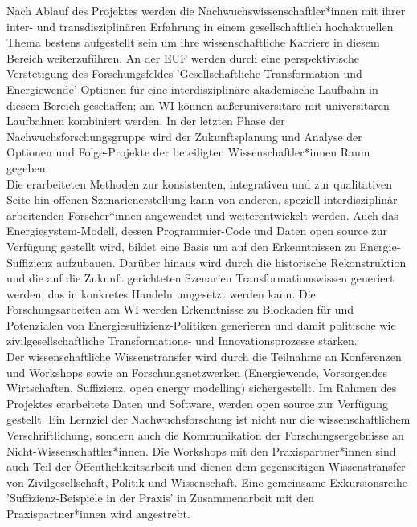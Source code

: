 \documentclass[a4paper,11pt,twoside]{scrartcl}
\begin{document}
Nach Ablauf des Projektes werden die Nachwuchswissenschaftler*innen mit ihrer inter- und transdisziplinären Erfahrung in einem gesellschaftlich hochaktuellen Thema bestens aufgestellt sein um ihre wissenschaftliche Karriere in diesem Bereich weiterzuführen. An der EUF werden durch eine perspektivische Verstetigung des Forschungsfeldes 'Gesellschaftliche Transformation und Energiewende' Optionen für eine interdisziplinäre akademische Laufbahn in diesem Bereich geschaffen; am WI können außeruniversitäre mit universitären Laufbahnen kombiniert werden. In der letzten Phase der Nachwuchsforschungsgruppe wird der Zukunftsplanung und Analyse der Optionen und Folge-Projekte der beteiligten Wissenschaftler*innen Raum gegeben.\\
Die erarbeiteten Methoden zur konsistenten, integrativen und zur qualitativen Seite hin offenen Szenarienerstellung kann von anderen, speziell interdisziplinär arbeitenden Forscher*innen angewendet und weiterentwickelt werden. Auch das Energiesystem-Modell, dessen Programmier-Code und Daten open source zur Verfügung gestellt wird, bildet eine Basis um auf den Erkenntnissen zu Energie-Suffizienz aufzubauen. Darüber hinaus wird durch die historische Rekonstruktion und die auf die Zukunft gerichteten Szenarien Transformationswissen generiert werden, das in konkretes Handeln umgesetzt werden kann. Die Forschungsarbeiten am WI werden Erkenntnisse zu Blockaden für und Potenzialen von Energiesuffizienz-Politiken generieren und damit politische wie zivilgesellschaftliche Transformations- und Innovationsprozesse stärken.\\
Der wissenschaftliche Wissenstransfer wird durch die Teilnahme an Konferenzen und Workshops sowie an Forschungsnetzwerken (Energiewende, Vorsorgendes Wirtschaften, Suffizienz, open energy modelling) sichergestellt. Im Rahmen des Projektes erarbeitete Daten und Software, werden open source zur Verfügung gestellt. Ein Lernziel der Nachwuchsforschung ist nicht nur die wissenschaftlichem Verschriftlichung, sondern auch die Kommunikation der Forschungsergebnisse an Nicht-Wissenschaftler*innen. Die Workshops mit den Praxispartner*innen sind auch Teil der Öffentlichkeitsarbeit und dienen dem gegenseitigen Wissenstransfer von Zivilgesellschaft, Politik und Wissenschaft. Eine gemeinsame Exkursionsreihe 'Suffizienz-Beispiele in der Praxis' in Zusammenarbeit mit den Praxispartner*innen wird angestrebt.
\end{document}
